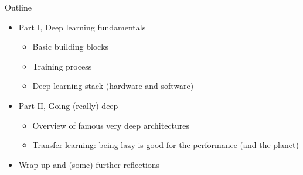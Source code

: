 \documentclass[usenames,dvipsnames]{beamer}
\begin{document}
    \begin{frame}{\secname}
        Outline
        \begin{itemize}
            \item Part I, Deep learning fundamentals
            \begin{itemize}
                \item Basic building blocks
                \item Training process
                \item Deep learning stack (hardware and software)
            \end{itemize}
            \item Part II, Going (really) deep
            \begin{itemize}
                \item Overview of famous very deep architectures
                \item Transfer learning: being lazy is good for the performance (and the planet)
            \end{itemize}
            \item Wrap up and (some) further reflections
        \end{itemize}
    \end{frame}



        
\end{document}
